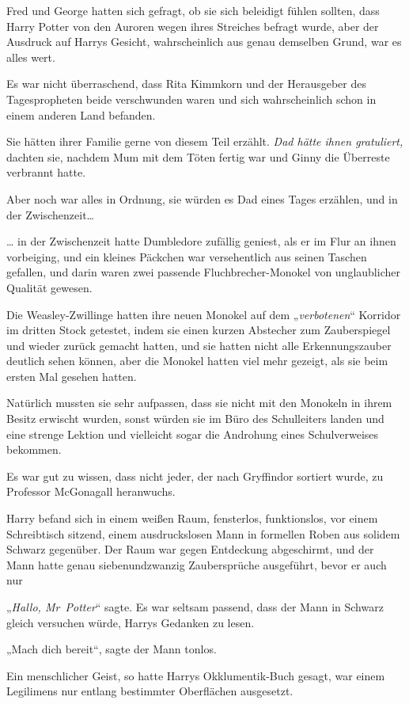 {Fred und George hatten sich gefragt, ob sie sich beleidigt fühlen sollten, dass Harry Potter von den Auroren wegen ihres Streiches befragt wurde, aber der Ausdruck auf Harrys Gesicht, wahrscheinlich aus genau demselben Grund, war es alles wert.

Es war nicht überraschend, dass Rita Kimmkorn und der Herausgeber des Tagespropheten beide verschwunden waren und sich wahrscheinlich schon in einem anderen Land befanden.

Sie hätten ihrer Familie gerne von diesem Teil erzählt. \emph{Dad hätte ihnen gratuliert,} dachten sie, nachdem Mum mit dem Töten fertig war und Ginny die Überreste verbrannt hatte.

Aber noch war alles in Ordnung, sie würden es Dad eines Tages erzählen, und in der Zwischenzeit…

… in der Zwischenzeit hatte Dumbledore zufällig geniest, als er im Flur an ihnen vorbeiging, und ein kleines Päckchen war versehentlich aus seinen Taschen gefallen, und darin waren zwei passende Fluchbrecher-Monokel von unglaublicher Qualität gewesen.

Die Weasley-Zwillinge hatten ihre neuen Monokel auf dem „\emph{verbotenen}“ Korridor im dritten Stock getestet, indem sie einen kurzen Abstecher zum Zauberspiegel und wieder zurück gemacht hatten, und sie hatten nicht alle Erkennungszauber deutlich sehen können, aber die Monokel hatten viel mehr gezeigt, als sie beim ersten Mal gesehen hatten.

Natürlich mussten sie sehr aufpassen, dass sie nicht mit den Monokeln in ihrem Besitz erwischt wurden, sonst würden sie im Büro des Schulleiters landen und eine strenge Lektion und vielleicht sogar die Androhung eines Schulverweises bekommen.

Es war gut zu wissen, dass nicht jeder, der nach Gryffindor sortiert wurde, zu Professor McGonagall heranwuchs.

Harry befand sich in einem weißen Raum, fensterlos, funktionslos, vor einem Schreibtisch sitzend, einem ausdruckslosen Mann in formellen Roben aus solidem Schwarz gegenüber. Der Raum war gegen Entdeckung abgeschirmt, und der Mann hatte genau siebenundzwanzig Zaubersprüche ausgeführt, bevor er auch nur

„\emph{Hallo, Mr~Potter}“ sagte. Es war seltsam passend, dass der Mann in Schwarz gleich versuchen würde, Harrys Gedanken zu lesen.

„Mach dich bereit“, sagte der Mann tonlos.

Ein menschlicher Geist, so hatte Harrys Okklumentik-Buch gesagt, war einem Legilimens nur entlang bestimmter Oberflächen ausgesetzt.

}
